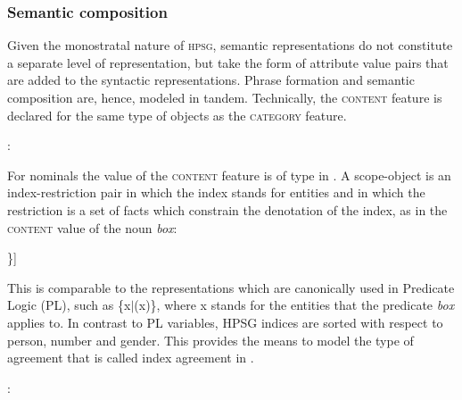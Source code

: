 \documentclass[output=paper
                ,modfonts
                ,nonflat
	        ,collection
	        ,collectionchapter
	        ,collectiontoclongg
 	        ,biblatex
                ,babelshorthands
                ,newtxmath
                ,draftmode
                ,colorlinks, citecolor=brown
]{./langsci/langscibook}
\begin{document}
\subsubsection{Semantic composition}


Given the monostratal nature of \textsc{hpsg}, semantic representations 
do not constitute a separate level of representation, but take the form 
of attribute value pairs that are added to the syntactic representations.   
Phrase formation and semantic composition are, hence, modeled in tandem.  
Technically, the \textsc{content} feature is declared for the same type of objects 
as the \textsc{category} feature. 

\begin{exe} 
\ex  {}: \begin{avm} 
                   \end{avm} 
\end{exe} 

\noindent 
For nominals the value of the \textsc{content} feature is of type  
in \citet{GS00}. 
A scope-object is an index-restriction pair in which the index stands for 
entities and in which the restriction is a set of facts which constrain the 
denotation of the index, as in the \textsc{content} value of the noun \emph{box}:    

\begin{exe} 
\ex\label{red} 
\begin{avm}
[\type{scope-obj}        \\
 index @1 \type{index} \\
 restr \{[\type{box}   \\
            arg @1 ]\}]
\end{avm} 
\end{exe}

\noindent
This is comparable to the representations which are canonically used in 
Predicate Logic (PL), such as \{x$|$(x)\}, where x stands for 
the entities that the predicate \emph{box} applies to. In contrast to 
PL variables, HPSG indices are sorted with respect to person, number 
and gender. This provides the means to model the type of agreement that 
is called index agreement in .

\begin{exe} 
\ex  {}: \begin{avm}
                     \end{avm} 
\end{exe} 
\end{document}
